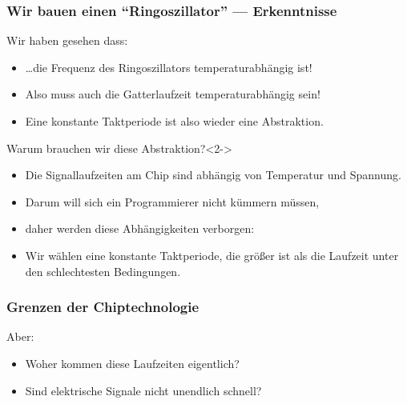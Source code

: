 
\begin{frame}
	\frametitle{Wir bauen einen ``Ringoszillator'' --- Erkenntnisse}

	\begin{block}{Wir haben gesehen dass:}
		\begin{itemize}
			\item \ldots die Frequenz des Ringoszillators temperaturabhängig ist!
			\item Also muss auch die Gatterlaufzeit temperaturabhängig sein!
			\item Eine konstante Taktperiode ist also wieder eine
				Abstraktion.
		\end{itemize}
	\end{block}

	\begin{block}{Warum brauchen wir diese Abstraktion?}<2->
		\begin{itemize}
			\item Die Signallaufzeiten am Chip sind abhängig von Temperatur und Spannung.
			\item Darum will sich ein Programmierer nicht kümmern müssen,
			\item daher werden diese Abhängigkeiten verborgen:
			\item Wir wählen eine konstante Taktperiode, die größer ist als die Laufzeit unter
				den schlechtesten Bedingungen.
		\end{itemize}
	\end{block}
\end{frame}

\begin{frame}
	\frametitle{Grenzen der Chiptechnologie}

	\begin{alertblock}{Aber:}
		\begin{itemize}
			\item Woher kommen diese Laufzeiten eigentlich?
			\item Sind elektrische Signale nicht unendlich schnell?
		\end{itemize}
	\end{alertblock}

\end{frame}

